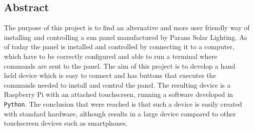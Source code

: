 \documentclass[a4paper]{article}
\begin{document}
    \subsection*{Abstract} %
    \label{sub:abstract}
            The purpose of this project is to find an alternative and more 
            user friendly way of installing and controlling a sun panel 
            manufactured by Parans Solar Lighting. As of today the panel is 
            installed and controlled by connecting it to a computer, 
            which have to be correctly configured and able to run a terminal 
            where commands are sent to the panel. The aim of this project is 
            to develop a hand held device which is easy to connect and has 
            buttons that executes the commands needed to install and control 
            the panel. The resulting device is a Raspberry Pi with an attached
            touchscreen, running a software developed in \texttt{Python}.  
            The conclusion that were reached is that such a device is easily 
            created with standard hardware, although results in a large device 
            compared to other touchscreen devices such as smartphones.
            
\end{document}
